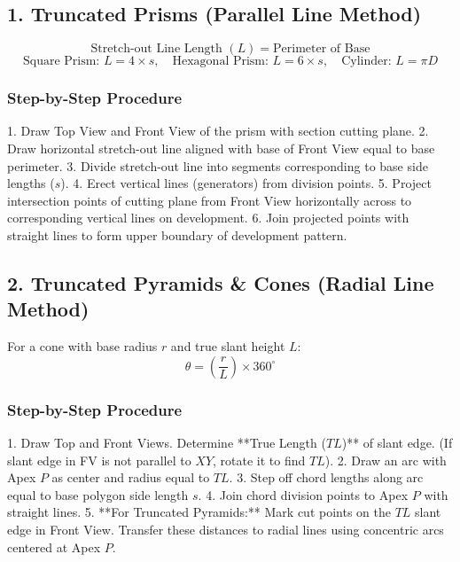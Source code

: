 \subsection{1. Truncated Prisms (Parallel Line Method)}

\begin{keyequation}
\begin{equation}
    \text{Stretch-out Line Length } (L) = \text{Perimeter of Base}
\end{equation}
$$\text{Square Prism: } L = 4 \times s, \quad \text{Hexagonal Prism: } L = 6 \times s, \quad \text{Cylinder: } L = \pi D$$
\end{keyequation}

\subsubsection{Step-by-Step Procedure}
1. Draw Top View and Front View of the prism with section cutting plane.
2. Draw horizontal stretch-out line aligned with base of Front View equal to base perimeter.
3. Divide stretch-out line into segments corresponding to base side lengths ($s$).
4. Erect vertical lines (generators) from division points.
5. Project intersection points of cutting plane from Front View horizontally across to corresponding vertical lines on development.
6. Join projected points with straight lines to form upper boundary of development pattern.

\subsection{2. Truncated Pyramids \& Cones (Radial Line Method)}

\begin{keyequation}
For a cone with base radius $r$ and true slant height $L$:
\begin{equation}
    \theta = \left( \frac{r}{L} \right) \times 360^\circ
\end{equation}
\end{keyequation}

\subsubsection{Step-by-Step Procedure}
1. Draw Top and Front Views. Determine **True Length ($TL$)** of slant edge. (If slant edge in FV is not parallel to $XY$, rotate it to find $TL$).
2. Draw an arc with Apex $P$ as center and radius equal to $TL$.
3. Step off chord lengths along arc equal to base polygon side length $s$.
4. Join chord division points to Apex $P$ with straight lines.
5. **For Truncated Pyramids:** Mark cut points on the $TL$ slant edge in Front View. Transfer these distances to radial lines using concentric arcs centered at Apex $P$.

